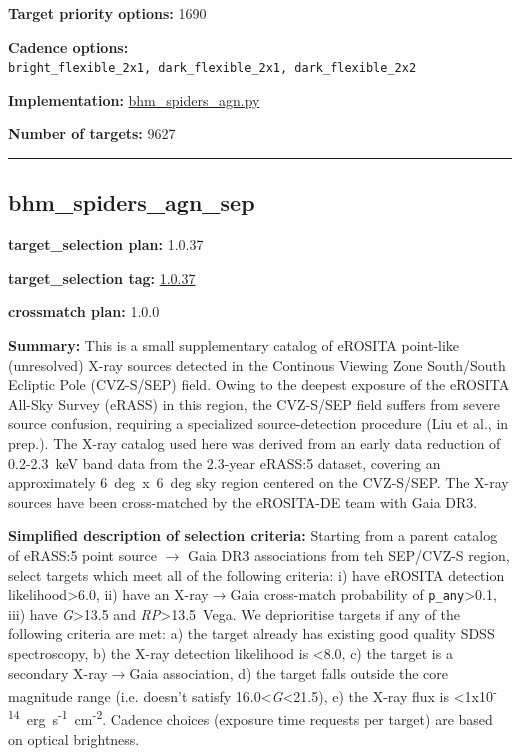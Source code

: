 \noindent\textbf{Target priority options:} 1690

\noindent\textbf{Cadence options:}
\texttt{bright\_flexible\_2x1,\ dark\_flexible\_2x1,\ dark\_flexible\_2x2}

\noindent\textbf{Implementation:}
\href{https://github.com/sdss/target_selection/blob/1.0.37/python/target_selection/cartons/bhm_spiders_agn.py}{bhm\_spiders\_agn.py}

\noindent\textbf{Number of targets:} 9627

\begin{center}\rule{0.5\linewidth}{0.5pt}\end{center}

\hypertarget{bhm_spiders_agn_sep_plan1.0.37}{%
\subsection{bhm\_spiders\_agn\_sep}\label{bhm_spiders_agn_sep_plan1.0.37}}

\noindent\textbf{target\_selection plan:} 1.0.37

\noindent\textbf{target\_selection tag:}
\href{https://github.com/sdss/target_selection/tree/1.0.37/}{1.0.37}

\noindent\textbf{crossmatch plan:} 1.0.0

\noindent\textbf{Summary:} This is a small supplementary catalog of eROSITA
point-like (unresolved) X-ray sources detected in the Continous Viewing
Zone South/South Ecliptic Pole (CVZ-S/SEP) field. Owing to the deepest
exposure of the eROSITA All-Sky Survey (eRASS) in this region, the
CVZ-S/SEP field suffers from severe source confusion, requiring a
specialized source-detection procedure (Liu et al., in prep.). The X-ray
catalog used here was derived from an early data reduction of
0.2-2.3~keV band data from the 2.3-year eRASS:5 dataset, covering an
approximately 6~deg~x~6~deg sky region centered on the CVZ-S/SEP. The
X-ray sources have been cross-matched by the eROSITA-DE team with Gaia
DR3.

\noindent\textbf{Simplified description of selection criteria:} Starting from a
parent catalog of eRASS:5 point source $\rightarrow$ Gaia DR3 associations from teh
SEP/CVZ-S region, select targets which meet all of the following
criteria: i) have eROSITA detection likelihood\textgreater6.0, ii) have
an X-ray$\rightarrow$Gaia cross-match probability of \texttt{p\_any}\textgreater0.1,
iii) have \emph{G}\textgreater13.5 and \emph{RP}\textgreater13.5~Vega.
We deprioritise targets if any of the following criteria are met: a) the
target already has existing good quality SDSS spectroscopy, b) the X-ray
detection likelihood is \textless8.0, c) the target is a secondary
X-ray$\rightarrow$Gaia association, d) the target falls outside the core magnitude
range (i.e. doesn't satisfy 16.0\textless{}\emph{G}\textless21.5), e)
the X-ray flux is
\textless1x10\textsuperscript{-14}~erg~s\textsuperscript{-1}~cm\textsuperscript{-2}.
Cadence choices (exposure time requests per target) are based on optical
brightness.


